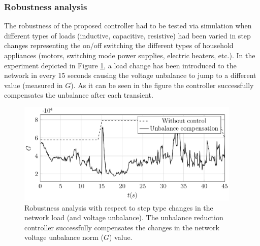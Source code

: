      \subsubsection{Robustness analysis}\label{VUB:sec:Robustness}

            The robustness of the proposed controller had to be tested via simulation when different types of loads (inductive, capacitive, resistive) had been varied in step changes representing the on/off switching the different types of household appliances (motors, switching mode power supplies, electric heaters, etc.). In the experiment depicted in Figure \ref{fig:robustness}, a load change has been introduced to the network in every 15 seconds causing the voltage unbalance to jump to a different value (measured in $G$). As it can be seen in the figure the controller successfully compensates the unbalance after each transient.

              \begin{figure}[ht]
            \centering
            \includegraphics[width=0.95\textwidth]{Unblance_EPS_Pics/UnbalRedComp_JCP-figure5.eps}
            \caption{Robustness analysis with respect to step type changes in the network load (and voltage unbalance). The unbalance reduction controller successfully compensates the changes in the network voltage unbalance norm ($G$) value.}
            \label{fig:robustness}
            \end{figure}

            \subsubsection{}\label{VUB:sec:Measurement}

